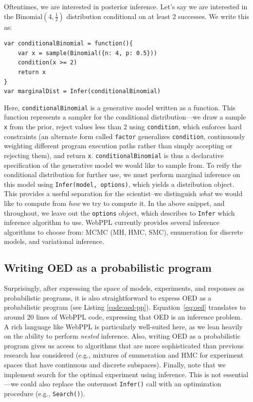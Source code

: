 \documentclass{article}
\begin{document}
Oftentimes, we are interested in posterior inference. Let's say we are interested in the $\text{Binomial}(4, \frac{1}{2})$ distribution conditional on at least 2 successes. We write this as:
%
\begin{lstlisting}[mathescape, label={code:webppl}]
var conditionalBinomial = function(){
	var x = sample(Binomial({n: 4, p: 0.5}))
	condition(x >= 2)
	return x
}
var marginalDist = Infer(conditionalBinomial)
\end{lstlisting}
Here, \lstinline{conditionalBinomial} is a generative model written as a function.
This function represents a sampler for the conditional distribution---we draw a sample \lstinline{x} from the prior, reject values less than 2 using \lstinline{condition}, which enforces hard constraints (an alternate form called \lstinline{factor} generalizes \lstinline{condition}, continuously weighting different program execution paths rather than simply accepting or rejecting them), and return \lstinline{x}.
\lstinline{conditionalBinomial} is thus a declarative specification of the generative model we would like to sample from.
To reify the conditional distribution for further use, we must perform marginal inference on this model using \lstinline{Infer(model, options)}, which yields a distribution object.
This provides a useful separation for the scientist--we distinguish \emph{what} we would like to compute from \emph{how} we try to compute it.
In the above snippet, and throughout, we leave out the \lstinline{options} object, which describes to \lstinline{Infer} which inference algorithm to use. WebPPL currently provides several inference algorithms to choose from: MCMC (MH, HMC, SMC), enumeration for discrete models, and variational inference.

\subsection{Writing OED as a probabilistic program}

Surprisingly, after expressing the space of models, experiments, and responses as probabilistic programs, it is also straightforward to express OED as a probabilistic program (see Listing \ref{code:oed-pp}).
Equation~\ref{eq:oed} translates to around 20 lines of WebPPL code, expressing that OED is an inference problem.
A rich language like WebPPL is particularly well-suited here, as we lean heavily on the ability to perform \emph{nested} inference.
Also, writing OED as a probabilistic program gives us access to algorithms that are more sophisticated than previous research has considered (e.g., mixtures of enumeration and HMC for experiment spaces that have continuous and discrete subspaces).
Finally, note that we implement search for the optimal experiment using inference.
This is not essential---we could also replace the outermost \lstinline|Infer()| call with an optimization procedure (e.g., \lstinline|Search()|).
\end{document}
